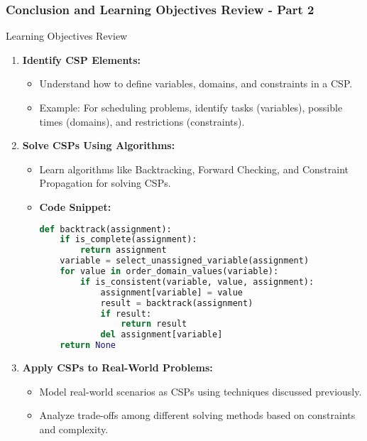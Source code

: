 \documentclass[aspectratio=169]{beamer}
\begin{document}
\begin{frame}[fragile]
    \frametitle{Conclusion and Learning Objectives Review - Part 2}
    \begin{block}{Learning Objectives Review}
        \begin{enumerate}
            \item \textbf{Identify CSP Elements:}
            \begin{itemize}
                \item Understand how to define variables, domains, and constraints in a CSP.
                \item Example: For scheduling problems, identify tasks (variables), possible times (domains), and restrictions (constraints).
            \end{itemize}
            
            \item \textbf{Solve CSPs Using Algorithms:}
            \begin{itemize}
                \item Learn algorithms like Backtracking, Forward Checking, and Constraint Propagation for solving CSPs.
                \item \textbf{Code Snippet:}
                \begin{lstlisting}[language=Python]
def backtrack(assignment):
    if is_complete(assignment):
        return assignment
    variable = select_unassigned_variable(assignment)
    for value in order_domain_values(variable):
        if is_consistent(variable, value, assignment):
            assignment[variable] = value
            result = backtrack(assignment)
            if result:
                return result
            del assignment[variable]
    return None
                \end{lstlisting}
            \end{itemize}

            \item \textbf{Apply CSPs to Real-World Problems:}
            \begin{itemize}
                \item Model real-world scenarios as CSPs using techniques discussed previously.
                \item Analyze trade-offs among different solving methods based on constraints and complexity.
            \end{itemize}
        \end{enumerate}
    \end{block}
\end{frame}
\end{document}

